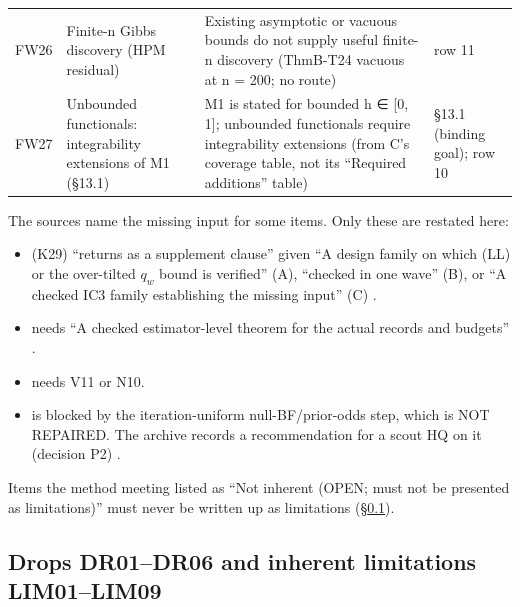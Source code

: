 {\begin{xltabular}{\textwidth}{@{}>{\raggedright\arraybackslash}p{1.25cm} >{\raggedright\arraybackslash}X >{\raggedright\arraybackslash}X >{\raggedright\arraybackslash}p{2.5cm}@{}}
 FW26 & Finite-n Gibbs discovery (HPM residual) & Existing asymptotic or vacuous bounds do not supply useful finite-n discovery (ThmB-T24 vacuous at n = 200; no route)  & row 11 \\
 FW27 & Unbounded functionals: integrability extensions of M1 (§13.1) & M1 is stated for bounded h ∈ [0, 1]; unbounded functionals require integrability extensions (from C's coverage table, not its ``Required additions'' table)  & §13.1 (binding goal); row 10 \\
\bottomrule
\end{xltabular}
}

\begin{agentnote}
The sources name the missing input for some items. Only these are restated here:
\begin{itemize}
\item {} (K29) ``returns as a supplement clause'' given ``A design family on which (LL) or the over-tilted $q_w$ bound is verified'' (A), ``checked in one wave'' (B), or ``A checked IC3 family establishing the missing input'' (C) .
\item {} needs ``A checked estimator-level theorem for the actual records and budgets'' .
\item {} needs V11 or N10.
\item {} is blocked by the iteration-uniform null-BF/prior-odds step, which is NOT REPAIRED. The archive records a recommendation for a scout HQ on it (decision P2) .
\end{itemize}
Items the method meeting listed as ``Not inherent (OPEN; must not be presented as limitations)'' must never be written up as limitations (§\ref{sec:drops}).
\end{agentnote}

\subsection{Drops DR01--DR06 and inherent limitations LIM01--LIM09}\label{sec:drops}

